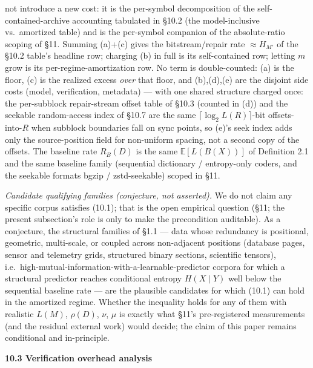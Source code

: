 \documentclass[
]{article}
\begin{document}
not introduce a new cost: it is the per-symbol decomposition of the
self-contained-archive accounting tabulated in §10.2 (the
model-inclusive vs.\ amortized table) and is the per-symbol companion
of the absolute-ratio scoping of §11. Summing (a)+(c) gives the
bitstream/repair rate $\approx H_{M'}$ of the §10.2 table's headline
row; charging (b) in full is its self-contained row; letting $m$ grow
is its per-regime-amortization row. No term is double-counted: (a) is
the floor, (c) is the realized excess \emph{over} that floor, and
(b),(d),(e) are the disjoint side costs (model, verification,
metadata) --- with one shared structure charged once: the per-subblock
repair-stream offset table of §10.3 (counted in (d)) and the seekable
random-access index of §10.7 are the same $\lceil\log_2 L(R)\rceil$-bit
offsets-into-$R$ when subblock boundaries fall on sync points, so (e)'s
seek index adds only the source-position field for non-uniform spacing,
not a second copy of the offsets. The baseline rate $R_B(D)$ is the same $\mathbb{E}[L(B(X))]$
of Definition 2.1 and the same baseline family (sequential dictionary /
entropy-only coders, and the seekable formats bgzip / zstd-seekable)
scoped in §11.

\emph{Candidate qualifying families (conjecture, not asserted).} We do
not claim any specific corpus satisfies (10.1); that is the open
empirical question (§11; the present subsection's role is only to make
the precondition auditable). As a conjecture, the structural families
of §1.1 --- data whose redundancy is positional, geometric,
multi-scale, or coupled across non-adjacent positions (database pages,
sensor and telemetry grids, structured binary sections, scientific
tensors), i.e.\ high-mutual-information-with-a-learnable-predictor
corpora for which a structural predictor reaches conditional entropy
$H(X\mid Y)$ well below the sequential baseline rate --- are the
plausible candidates for which (10.1) can hold in the amortized regime.
Whether the inequality holds for any of them with realistic $L(M)$,
$\rho(D)$, $\nu$, $\mu$ is exactly what §11's pre-registered
measurements (and the residual external work) would decide; the claim
of this paper remains conditional and in-principle.

\textbf{10.3 Verification overhead analysis}
\end{document}

